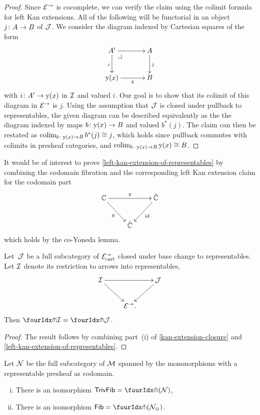 \documentclass[reqno,10pt,a4paper,oneside]{amsart}
\begin{document}
\begin{proof}
Since $\catE^\to$ is cocomplete, we can verify the claim using the colimit formula for left Kan extensions.
All of the following will be functorial in an object $j \co A \to B$ of $\cal{J}$.
We consider the diagram indexed by Cartesian squares of the form
\[
\xymatrix@C=1.2cm{
  A'
  \ar[r]
  \ar[d]_{i}
  \pullback{dr}
&
  A
  \ar[d]^{j}
\\
  \yon(x)
  \ar[r]_-b
&
  B
}
\]
with $i \co A' \to \yon(x)$ in $\cal{I}$ and valued $i$.
Our goal is to show that its colimit of this diagram in $\catE^\to$ is $j$.
Using the assumption that $\cal{J}$ is closed under pullback to representables, the given diagram can be described equivalently as the the diagram indexed by maps $b \co \yon(x) \to B$ and valued $b^*(j)$.
The claim can then be restated as $\colim_{b \co \yon(x) \to B} b^*(j) \iso j$, which holds since pullback commutes with colimits in presheaf categories, and $\colim_{b \co \yon(x) \to B} \yon(x) \iso B$.
\end{proof}

\begin{remark}
It would be of interest to prove \cref{left-kan-extension-of-representables} by combining the codomain fibration and the corresponding left Kan extension claim for the codomain part
\[
\xymatrix{
  \cat{C}
  \ar[rr]^{y}
  \ar[dr]_{y}
&&
  \hat{\catC}
  \ar[dl]^{\id}
\\&
  \hat{\cat{C}}
}
\]
which holds by the co-Yoneda lemma.
\end{remark}

\begin{proposition} \label{awfs-on-arrows-into-representables}
Let~$\cal{J}$ be a full subcategory of $\catE_{\cart}^\to$ closed under base change to representables.
Let $\cal{I}$ denote its restriction to arrows into representables,
\[
\xymatrix{
  \cal{I}
  \ar[rr]
  \ar[dr]
&&
  \cal{J}
  \ar[dl]
\\&
  \catE^\to \rlap{.}
}
\]
Then $\liftr{\cal{I}} = \liftr{\cal{J}}$.
\end{proposition}

\begin{proof}
The result follows by combining part~(i) of \cref{kan-extension-closure} and \cref{left-kan-extension-of-representables}.
\end{proof}



\begin{theorem} \label{small-gen-triv-kan} Let $\cal{N}$ be the full subcategory of $\cal{M}$ spanned by the mononorphisms with a representable presheaf as codomain.
\begin{enumerate}[(i)]
\item There is an isomorphism $\mathsf{TrivFib} = \liftr{ ( \cal{N}) }$,
\item There is an isomorphism $\mathsf{Fib} = \liftr{(\cal{N}_\otimes)}$.
\end{enumerate}
\end{theorem}
\end{document}

